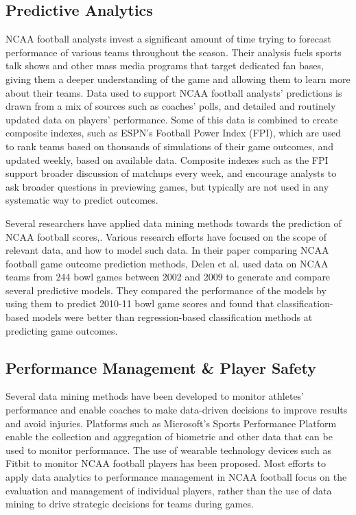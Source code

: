 \documentclass[sigconf]{acmart}
\begin{document}
\subsection{Predictive Analytics}
NCAA football analysts invest a significant amount of time trying to forecast performance of various teams throughout the season. Their analysis fuels sports talk shows and other mass media programs that target dedicated fan bases, giving them a deeper understanding of the game and allowing them to learn more about their teams. Data used to support NCAA football analysts' predictions is drawn from a mix of sources such as coaches' polls, and detailed and routinely updated data on players' performance. Some of this data is combined to create composite indexes, such as ESPN's Football Power Index (FPI)\cite{espn2017}, which are used to rank teams based on thousands of simulations of their game outcomes, and updated weekly, based on available data. Composite indexes such as the FPI support broader discussion of matchups every week, and encourage analysts to ask broader questions in previewing games, but typically are not used in any systematic way to predict outcomes.

Several researchers have applied data mining methods towards the prediction of NCAA football scores\cite{Leung2014},\cite{Delen2012}. Various research efforts have focused on the scope of relevant data, and how to model such data. In their paper comparing NCAA football game outcome prediction methods, Delen et al. used data on NCAA teams from 244 bowl games between 2002 and 2009 to generate and compare several predictive models\cite{Delen2012}. They compared the performance of the models by using them to predict 2010-11 bowl game scores and found that classification-based models were better than regression-based classification methods at predicting game outcomes. 

\subsection{Performance Management \& Player Safety}

Several data mining methods have been developed to monitor athletes' performance and enable coaches to make data-driven decisions to improve results and avoid injuries. Platforms such as Microsoft's Sports Performance Platform \cite{Hansen2017} enable the collection and aggregation of biometric and other data that can be used to monitor performance. The use of wearable technology devices such as Fitbit to monitor NCAA football players has been proposed. Most efforts to apply data analytics to performance management in NCAA football focus on the evaluation and management of individual players, rather than the use of data mining to drive strategic decisions for teams during games.
\end{document}
